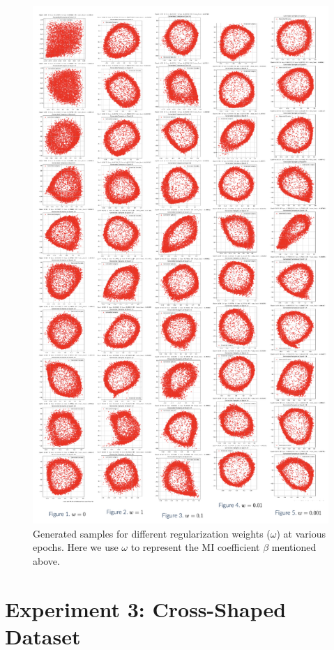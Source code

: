 \documentclass[lettersize,journal]{IEEEtran}
\begin{document}
\begin{figure}[h]
    \centering
    \includegraphics[width=1\linewidth]{figures/gg.png}
    \caption{Generated samples for different regularization weights (\( \omega \)) at various epochs. Here we use \( \omega \) to represent the MI coefficient \( \beta \) mentioned above.}
    \label{fig:circular_samples}
\end{figure}

\section{Experiment 3: Cross-Shaped Dataset}
\end{document}
